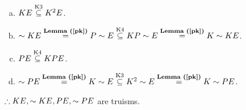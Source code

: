 \begin{pr}[12.12.8]$ $
\begin{enumerate}[(a)]
\item $KE\overset{\text{K3}}\subseteq K^2E$.
\item $\sim KE\overtext{\rflm{pk}}=P\sim E\overtext{K4}\subseteq KP\sim E\overtext{\rflm{pk}}=K\sim KE$.
\item $PE\overset{\text{K4}}\subseteq KPE$.
\item $\sim PE\overtext{\rflm{pk}}=K\sim E\overtext{K3}\subseteq K^2\sim E\overtext{\rflm{pk}}=K\sim PE$.
\end{enumerate}
$\therefore KE, \sim KE, PE, \sim PE$ are truisms.
\end{pr}
